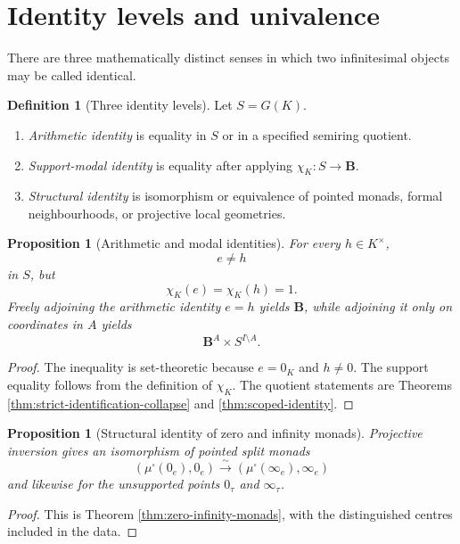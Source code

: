 \documentclass[11pt]{amsart}
\numberwithin{equation}{section}
\newtheorem{proposition}[theorem]{Proposition}
\theoremstyle{definition}
\newtheorem{definition}[theorem]{Definition}
\newcommand{\B}{\mathbf B}
\begin{document}
\section{Identity levels and univalence}

There are three mathematically distinct senses in which two infinitesimal objects may be called identical.

\begin{definition}[Three identity levels]\label{def:identity-levels}
Let $S=G(K)$.
\begin{enumerate}[label=\textup{(\roman*)}]
\item \emph{Arithmetic identity} is equality in $S$ or in a specified semiring quotient.
\item \emph{Support-modal identity} is equality after applying $\chi_K:S\to\B$.
\item \emph{Structural identity} is isomorphism or equivalence of pointed monads, formal neighbourhoods, or projective local geometries.
\end{enumerate}
\end{definition}

\begin{proposition}[Arithmetic and modal identities]\label{prop:arithmetic-modal}
For every $h\in K^\times$,
\[
e\neq h
\]
in $S$, but
\[
\chi_K(e)=\chi_K(h)=1.
\]
Freely adjoining the arithmetic identity $e=h$ yields $\B$, while adjoining it only on coordinates in $A$ yields
\[
\B^A\times S^{I\setminus A}.
\]
\end{proposition}

\begin{proof}
The inequality is set-theoretic because $e=0_K$ and $h\neq0$.  The support equality follows from the definition of $\chi_K$.  The quotient statements are Theorems \ref{thm:strict-identification-collapse} and \ref{thm:scoped-identity}.
\end{proof}

\begin{proposition}[Structural identity of zero and infinity monads]\label{prop:structural-identity}
Projective inversion gives an isomorphism of pointed split monads
\[
(\mu^\square(0_e),0_e)
\xrightarrow{\sim}
(\mu^\square(\infty_e),\infty_e)
\]
and likewise for the unsupported points $0_\tau$ and $\infty_\tau$.
\end{proposition}

\begin{proof}
This is Theorem \ref{thm:zero-infinity-monads}, with the distinguished centres included in the data.
\end{proof}
\end{document}
